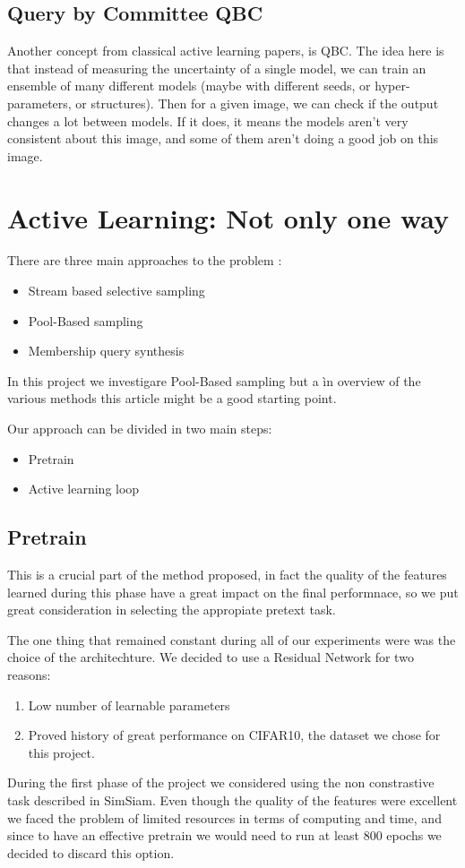 \documentclass{article}
\begin{document}
\begin{flushleft}
\subsection{Query by Committee QBC}
Another concept from classical active learning papers, is QBC. 
The idea here is that instead of measuring the uncertainty of a single model, 
we can train an ensemble of many different models (maybe with different seeds, 
or hyper-parameters, or structures). Then for a given image, 
we can check if the output changes a lot between models. If it does, 
it means the models aren’t very consistent about this image, 
and some of them aren’t doing a good job on this image.
\section{Active Learning: Not only one way}
There are three main approaches to the problem :
\begin{itemize}
    \item Stream based selective sampling
    \item Pool-Based sampling
    \item Membership query synthesis
\end{itemize}
In this project we investigare Pool-Based sampling but a ìn overview of the various methods this article might be a good starting point.
\begin{flushleft}
    Our approach can be divided in two main steps:
\end{flushleft}
\begin{itemize}
    \item Pretrain
    \item Active learning loop
\end{itemize}

\subsection{Pretrain}
This is a crucial part of the method proposed, in fact the quality of the features learned 
during this phase have a great impact on the final performnace, 
so we put great consideration in selecting the appropiate pretext task.

The one thing that remained constant during all of our experiments 
were was the choice of the architechture. 
We decided to use a Residual Network for two reasons:
\begin{enumerate}
    \item Low number of learnable parameters
    \item Proved history of great performance on CIFAR10, the dataset we chose for this project.
\end{enumerate}
During the first phase of the project we considered using the non constrastive task 
described in SimSiam. Even though the quality of the features were excellent 
we faced the problem of limited resources in terms of computing and time, 
and since to have an effective pretrain we would need to run at least 800 epochs 
we decided to discard this option.
\end{flushleft}
\end{document}
